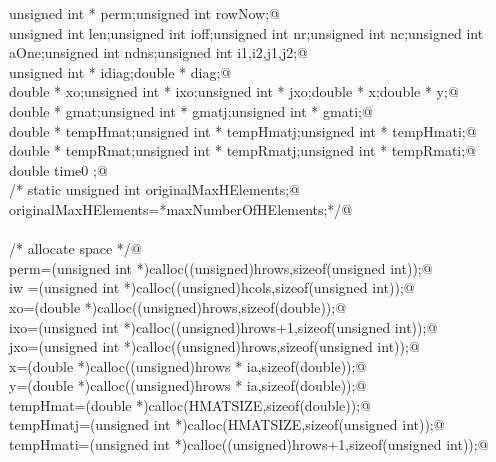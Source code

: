 \documentclass[12pt]{article}
\begin{document}
\begin{flushleft}
\begin{minipage}{\linewidth}
\begin{list}{}{}
\mbox{}\verb@        unsigned int * perm;unsigned int rowNow;@\\
\mbox{}\verb@        unsigned int len;unsigned int ioff;unsigned int nr;unsigned int nc;unsigned int aOne;unsigned int ndns;unsigned int i1,i2,j1,j2;@\\
\mbox{}\verb@        unsigned int * idiag;double * diag;@\\
\mbox{}\verb@        double * xo;unsigned int * ixo;unsigned int * jxo;double * x;double * y;@\\
\mbox{}\verb@        double * gmat;unsigned int * gmatj;unsigned int * gmati;@\\
\mbox{}\verb@        double * tempHmat;unsigned int * tempHmatj;unsigned int * tempHmati;@\\
\mbox{}\verb@        double * tempRmat;unsigned int * tempRmatj;unsigned int * tempRmati;@\\
\mbox{}\verb@        double time0 ;@\\
\mbox{}\verb@        /*      static unsigned int originalMaxHElements;@\\
\mbox{}\verb@                originalMaxHElements=*maxNumberOfHElements;*/@\\
\mbox{}\verb@@\\
\mbox{}\verb@        /* allocate space */@\\
\mbox{}\verb@        perm=(unsigned int *)calloc((unsigned)hrows,sizeof(unsigned int));@\\
\mbox{}\verb@        iw =(unsigned int *)calloc((unsigned)hcols,sizeof(unsigned int));@\\
\mbox{}\verb@        xo=(double *)calloc((unsigned)hrows,sizeof(double));@\\
\mbox{}\verb@        ixo=(unsigned int *)calloc((unsigned)hrows+1,sizeof(unsigned int));@\\
\mbox{}\verb@        jxo=(unsigned int *)calloc((unsigned)hrows,sizeof(unsigned int));@\\
\mbox{}\verb@        x=(double *)calloc((unsigned)hrows * ia,sizeof(double));@\\
\mbox{}\verb@        y=(double *)calloc((unsigned)hrows * ia,sizeof(double));@\\
\mbox{}\verb@        tempHmat=(double *)calloc(HMATSIZE,sizeof(double));@\\
\mbox{}\verb@        tempHmatj=(unsigned int *)calloc(HMATSIZE,sizeof(unsigned int));@\\
\mbox{}\verb@        tempHmati=(unsigned int *)calloc((unsigned)hrows+1,sizeof(unsigned int));@\\

\end{list}
\end{minipage}
\end{flushleft}
\end{document}
